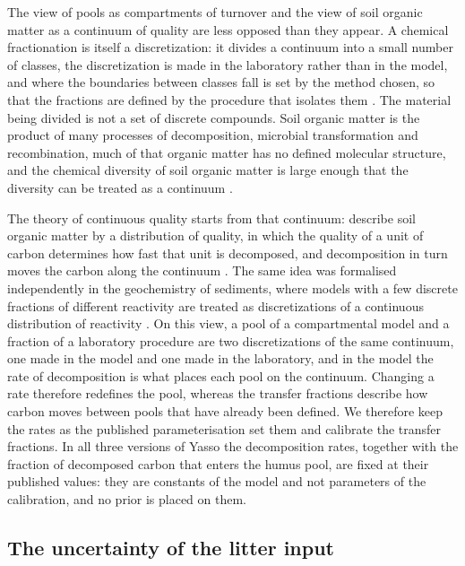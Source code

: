 \documentclass[11pt]{article}
\begin{document}
The view of pools as compartments of turnover and the view of soil organic matter as
a continuum of quality are less opposed than they appear. A chemical fractionation is
itself a discretization: it divides a continuum into a small number of classes, the
discretization is made in the laboratory rather than in the model, and where the
boundaries between classes fall is set by the method chosen, so that the fractions are
defined by the procedure that isolates them \citep{vonLutzow2007}. The material being
divided is not a set of discrete compounds. Soil organic matter is the product of many
processes of decomposition, microbial transformation and recombination, much of that
organic matter has no defined molecular structure, and the chemical diversity of soil
organic matter is large enough that the diversity can be treated as a continuum
\citep{LehmannKleber2015}.

The theory of continuous quality starts from that continuum: \citet{BosattaAgren1991}
describe soil organic matter by a distribution of quality, in which the quality of a
unit of carbon determines how fast that unit is decomposed, and decomposition in turn
moves the carbon along the continuum \citep{AgrenBosatta1998}. The same idea was
formalised independently in the geochemistry of sediments, where models with a few
discrete fractions of different reactivity are treated as discretizations of a
continuous distribution of reactivity \citep{BoudreauRuddick1991}. On this view, a
pool of a compartmental model and a fraction of a laboratory procedure are two
discretizations of the same continuum, one made in the model and one made in the
laboratory, and in the model the rate of decomposition is what places each pool on the
continuum. Changing a rate therefore redefines the pool, whereas the transfer
fractions describe how carbon moves between pools that have already been defined. We
therefore keep the rates as the published parameterisation set them and calibrate the
transfer fractions. In all three versions of Yasso the decomposition rates, together
with the fraction of decomposed carbon that enters the humus pool, are fixed at their
published values: they are constants of the model and not parameters of the
calibration, and no prior is placed on them.

\subsection{The uncertainty of the litter input}\label{sec:inputunc}
\end{document}
